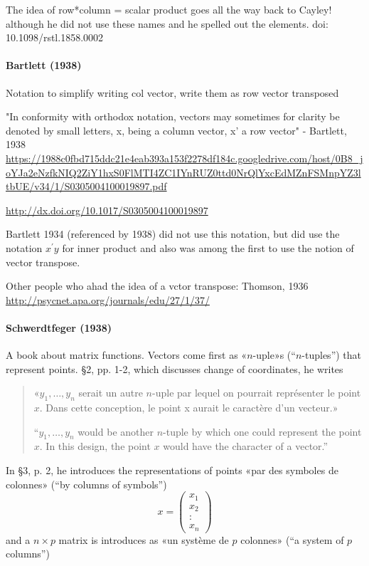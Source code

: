 The idea of row*column = scalar product goes all the way back to Cayley! although he did not use these names and he spelled out the elements.
doi: 10.1098/rstl.1858.0002



\paragraph{Bartlett (1938)}

Notation to simplify writing col vector, write them as row vector transposed

"In conformity with orthodox notation, vectors may sometimes for clarity be denoted by small letters, x, being a column vector, x' a row vector" - Bartlett, 1938 \url{https://1988c0fbd715ddc21e4eab393a153f2278df184c.googledrive.com/host/0B8_joYJa2eNzfkNIQ2ZiY1hxS0FlMTI4ZC1IYnRUZ0ttd0NrQlYxcEdMZnFSMnpYZ3ltbUE/v34/1/S0305004100019897.pdf}

\url{http://dx.doi.org/10.1017/S0305004100019897}

Bartlett 1934 (referenced by 1938) did not use this notation, but did use the notation $x^\prime y$ for inner product
and also was among the first to use the notion of vector transpose.

Other people who ahad the idea of a vctor transpose:
Thomson, 1936
\url{http://psycnet.apa.org/journals/edu/27/1/37/}



\paragraph{Schwerdtfeger (1938)~\cite{Schwerdtfeger1938}}

A book about matrix functions.
Vectors come first as «$n$-uple»s (``$n$-tuples'') that represent points. \S 2, pp. 1-2, which discusses change of coordinates, he writes
\begin{quote}
«$y_1, \dots, y_n$ serait un autre $n$-uple par lequel on pourrait représenter le point $x$. Dans cette conception, le point x aurait le caractère d'un vecteur.»

``$y_1, \dots, y_n$ would be another $n$-tuple by which one could represent the point $x$. In this design, the point $x$ would have the character of a vector.''
\end{quote}

In \S 3, p. 2, he introduces the representations of points «par des symboles de colonnes» (``by columns of symbols'')
\[
x =\begin{pmatrix}x_1\\x_2\\:\\x_n\end{pmatrix}
\]
and a $n \times p$ matrix is introduces as «un système de $p$ colonnes» (``a system of $p$ columns'')

